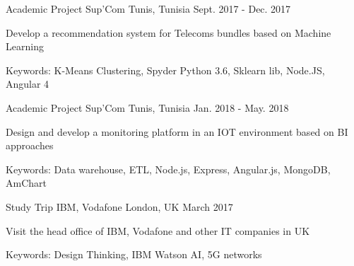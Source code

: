 \begin{cventries}
 \cventry
    {Academic Project} %
    {Sup'Com} %
    {Tunis, Tunisia} %
    {Sept. 2017 - Dec. 2017} %
    {
      \begin{cvitems} %
        \item {Develop a recommendation system for Telecoms bundles based on Machine Learning }
        \item {Keywords: K-Means Clustering, Spyder Python 3.6, Sklearn lib, Node.JS, Angular 4}
      \end{cvitems}
    }

  \cventry
    {Academic Project} %
    {Sup'Com} %
    {Tunis, Tunisia} %
    {Jan. 2018 - May. 2018} %
    {
      \begin{cvitems} %
        \item {Design and develop a monitoring platform in an IOT environment based on BI approaches }
        \item {Keywords: Data warehouse, ETL, Node.js, Express, Angular.js, MongoDB, AmChart}
      \end{cvitems}
    }

  \cventry
    {Study Trip} %
    {IBM, Vodafone } %
    {London, UK} %
    {March 2017 } %
    {
      \begin{cvitems} %
        \item {Visit the head office of IBM, Vodafone and other IT companies in UK}
        \item {Keywords: Design Thinking, IBM Watson AI, 5G networks }
      \end{cvitems}
    }

\end{cventries}
